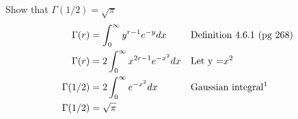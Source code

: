 \documentclass[12pt]{article}
\newenvironment{problem}[2][Problem]{\begin{trivlist}
\item[\hskip \labelsep {\bfseries #1}\hskip \labelsep {\bfseries #2.}]}{\end{trivlist}}
\begin{document}
\newpage
\begin{problem}{4.6.6}Show that $\Gamma (1/2) = \sqrt{\pi }$
\begin{align*}
\Gamma(r) &= \int_0^{\infty} y^{r-1}e^{-y}dx  && \text{Definition 4.6.1 (pg 268)} \\
\Gamma(r) &= 2\int_0^{\infty} x^{2r-1}e^{-x^2}dx  && \text{Let y =$x^2$} \\
\Gamma(1/2) &=2 \int_0^{\infty} e^{-x^2}dx  &&\text{Gaussian integral\footnotemark} \\
\Gamma(1/2) &= \sqrt{\pi }
\end{align*}
\end{problem}
\end{document}
